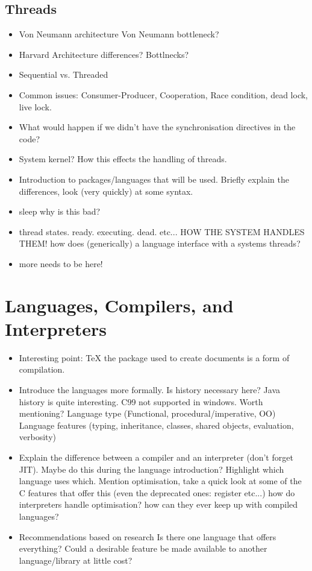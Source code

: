 \documentclass[11pt]{article} %
\begin{document}
\subsection{Threads}
\begin{itemize}
\item Von Neumann architecture
\subitem Von Neumann bottleneck?
\item Harvard Architecture
\subitem differences? Bottlnecks?
\item Sequential vs. Threaded
\item Common issues: Consumer-Producer, Cooperation, Race condition, dead lock, live lock.
\item What would happen if we didn't have the synchronisation directives in the code?
\item System kernel? How this effects the handling of threads.
\item Introduction to packages/languages that will be used.
\subitem Briefly explain the differences, look (very quickly) at some syntax.
\item sleep why is this bad?
\item thread states. ready. executing. dead. etc... HOW THE SYSTEM HANDLES THEM!
\subitem how does (generically) a language interface with a systems threads?
\item more needs to be here!
\end{itemize}
\section{Languages, Compilers, and Interpreters}
\begin{itemize}
\item Interesting point: TeX the package used to create documents is a form of compilation.
\item Introduce the languages more formally.
\subitem Is history necessary here? Java history is quite interesting. 
\subitem C99 not supported in windows. Worth mentioning?
\subitem Language type (Functional, procedural/imperative, OO)
\subitem Language features (typing, inheritance, classes, shared objects, evaluation, verbosity)
\item Explain the difference between a compiler and an interpreter (don't forget JIT). 
\subitem Maybe do this during the language introduction? 
\subitem Highlight which language uses which.
\subitem Mention optimisation, take a quick look at some of the C features that offer this (even the deprecated ones: register etc...)
\subitem how do interpreters handle optimisation?
\subitem how can they ever keep up with compiled languages?
\item Recommendations based on research
\subitem Is there one language that offers everything?
\subitem Could a desirable feature be made available to another language/library at little cost?
\end{itemize}
\end{document}
